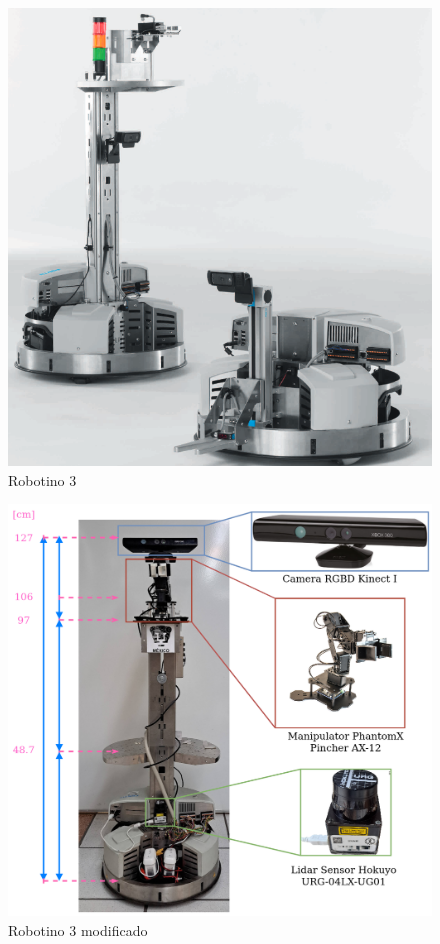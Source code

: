             \begin{figure}[H]
                \centering
                \includegraphics[scale=0.3]{Figures/RobotinoFESTO_base+torre.png}                 
                    \caption{Robotino 3 \cite{festo-didactic-robotino-2013}}
                    \label{fig:Robotino}
            \end{figure}
            
            \begin{figure}[H]
                \centering
                \includegraphics[scale=0.17]{Figures/Festino2023_medidas.png}
                    \caption{Robotino 3 modificado}
                    \label{fig:Robotino_NewNew}
            \end{figure}
                            
